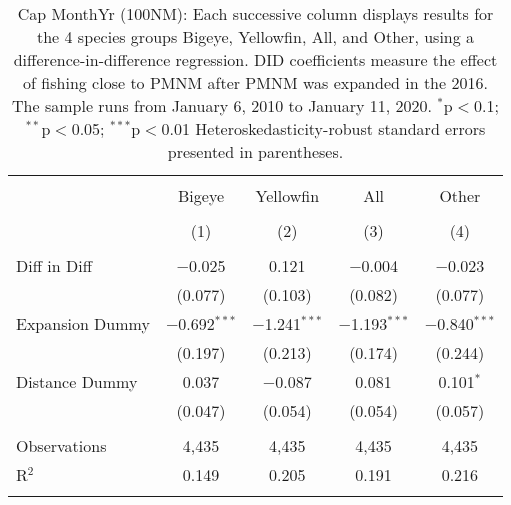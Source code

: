 
\begin{table}[!htbp] \centering 
  \caption{Cap MonthYr (100NM): Each successive column displays results for the 4 species groups Bigeye, Yellowfin, All, and Other, using a difference-in-difference regression. DID coefficients measure the effect of fishing close to PMNM after PMNM was expanded in the 2016. The sample runs from January 6, 2010 to January 11, 2020. $^{*}$p$<$0.1; $^{**}$p$<$0.05; $^{***}$p$<$0.01 Heteroskedasticity-robust standard errors presented in parentheses.} 
  \label{tbl:timeFE100NM} 
\begin{tabular}{@{\extracolsep{5pt}}lcccc} 
\\[-1.8ex]\hline 
\hline \\[-1.8ex] 
 & Bigeye & Yellowfin & All & Other \\ 
\\[-1.8ex] & (1) & (2) & (3) & (4)\\ 
\hline \\[-1.8ex] 
 Diff in Diff & $-$0.025 & 0.121 & $-$0.004 & $-$0.023 \\ 
  & (0.077) & (0.103) & (0.082) & (0.077) \\ 
  Expansion Dummy & $-$0.692$^{***}$ & $-$1.241$^{***}$ & $-$1.193$^{***}$ & $-$0.840$^{***}$ \\ 
  & (0.197) & (0.213) & (0.174) & (0.244) \\ 
  Distance Dummy & 0.037 & $-$0.087 & 0.081 & 0.101$^{*}$ \\ 
  & (0.047) & (0.054) & (0.054) & (0.057) \\ 
 \hline \\[-1.8ex] 
Observations & 4,435 & 4,435 & 4,435 & 4,435 \\ 
R$^{2}$ & 0.149 & 0.205 & 0.191 & 0.216 \\ 
\hline 
\hline \\[-1.8ex] 
\end{tabular} 
\end{table} 
